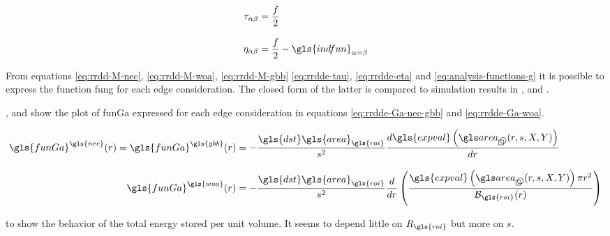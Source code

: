 \begin{align}
  \tau_{\alpha \beta} &=
    \frac{f}{2}
    \label{eq:rrdde-tau}
  \\[3mm]
  \eta_{\alpha \beta} &=
    \frac{f}{2} - \gls{indfun}_{\alpha = \beta}
    \label{eq:rrdde-eta}
\end{align}

\bigskip

From equations \eqref{eq:rrdd-M-nec}, \eqref{eq:rrdd-M-woa}, \eqref{eq:rrdd-M-gbb} \eqref{eq:rrdde-tau}, \eqref{eq:rrdde-eta} and \eqref{eq:analysis-functions-g} it is possible to express the function \gls{fung} for each edge consideration.
The closed form of the latter is compared to simulation results in ,  and .

%
%
%

\newpage

,  and  show the plot of \gls{funGa} expressed for each edge consideration in equations \eqref{eq:rrdde-Ga-nec-gbb} and \eqref{eq:rrdde-Ga-woa}.

\begin{align}
  \gls{funGa}^{\gls{nec}} (r) =
  \gls{funGa}^{\gls{gbb}} (r) &=
    - \frac{\gls{dst} \gls{area}_{\gls{roi}}}{s^2} \frac{d \gls{expval} \left( \cirsqr(r, s, X, Y) \right)}{dr}
    \label{eq:rrdde-Ga-nec-gbb}
  \\[3mm]
  \gls{funGa}^{\gls{woa}} (r) &=
    - \frac{\gls{dst} \gls{area}_{\gls{roi}}}{s^2} \frac{d}{dr} \left( \frac{\gls{expval} \left( \cirsqr(r, s, X, Y) \right) \pi r^2}{ \mathcal{B}_{\gls{roi}}(r)} \right)
    \label{eq:rrdde-Ga-woa}
\end{align}

%
%
%

\bigskip

 to  show the behavior of the total energy stored per unit volume. It seems to depend little on \( R_{\gls{roi}} \) but more on \( s \).

